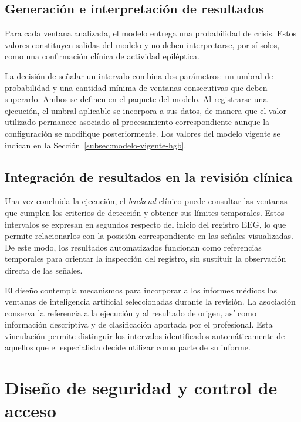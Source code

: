 \subsection{Generación e interpretación de resultados}
\label{subsec:generacion-interpretacion-resultados-ia}

Para cada ventana analizada, el modelo entrega una probabilidad de crisis.
Estos valores constituyen salidas del modelo y no deben interpretarse, por sí solos, como una confirmación clínica de actividad epiléptica.

La decisión de señalar un intervalo combina dos parámetros: un umbral de probabilidad y una cantidad mínima de ventanas consecutivas que deben superarlo.
Ambos se definen en el paquete del modelo.
Al registrarse una ejecución, el umbral aplicable se incorpora a sus datos, de manera que el valor utilizado permanece asociado al procesamiento correspondiente aunque la configuración se modifique posteriormente.
Los valores del modelo vigente se indican en la Sección~\ref{subsec:modelo-vigente-hgb}.

\subsection{Integración de resultados en la revisión clínica}
\label{subsec:integracion-resultados-revision-clinica}

Una vez concluida la ejecución, el \textit{backend} clínico puede consultar las ventanas que cumplen los criterios de detección y obtener sus límites temporales. Estos intervalos se expresan en segundos respecto del inicio del registro EEG, lo que permite relacionarlos con la posición correspondiente en las señales visualizadas. De este modo, los resultados automatizados funcionan como referencias temporales para orientar la inspección del registro, sin sustituir la observación directa de las señales.

El diseño contempla mecanismos para incorporar a los informes médicos las ventanas de inteligencia artificial seleccionadas durante la revisión. La asociación conserva la referencia a la ejecución y al resultado de origen, así como información descriptiva y de clasificación aportada por el profesional. Esta vinculación permite distinguir los intervalos identificados automáticamente de aquellos que el especialista decide utilizar como parte de su informe.

\section{Diseño de seguridad y control de acceso}
\label{sec:seguridad-control-acceso}

